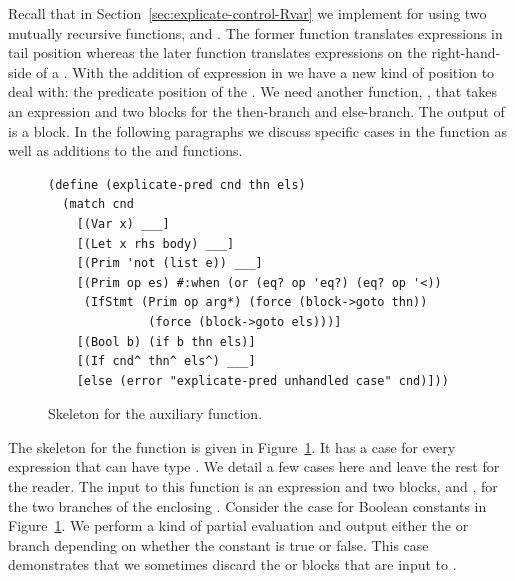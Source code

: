 \documentclass[11pt]{book}
\begin{document}


Recall that in Section~\ref{sec:explicate-control-Rvar} we implement
 for \LangVar{} using two mutually recursive
functions,  and .  The
former function translates expressions in tail position whereas the
later function translates expressions on the right-hand-side of a
. With the addition of  expression in \LangIf{} we
have a new kind of position to deal with: the predicate position of
the . We need another function, , that
takes an \LangIf{} expression and two blocks for the then-branch and
else-branch. The output of  is a block.
%
In the following paragraphs we discuss specific cases in the
 function as well as additions to the
 and  functions.

\begin{figure}[tbp]
\begin{lstlisting}
(define (explicate-pred cnd thn els)
  (match cnd
    [(Var x) ___]
    [(Let x rhs body) ___]
    [(Prim 'not (list e)) ___]
    [(Prim op es) #:when (or (eq? op 'eq?) (eq? op '<))
     (IfStmt (Prim op arg*) (force (block->goto thn))
              (force (block->goto els)))]
    [(Bool b) (if b thn els)]
    [(If cnd^ thn^ els^) ___]
    [else (error "explicate-pred unhandled case" cnd)]))
\end{lstlisting}
\caption{Skeleton for the  auxiliary function.}
\label{fig:explicate-pred}
\end{figure}

The skeleton for the  function is given in
Figure~\ref{fig:explicate-pred}. It has a case for every expression
that can have type .  We detail a few cases here and
leave the rest for the reader. The input to this function is an
expression and two blocks,  and , for the two
branches of the enclosing .
%
Consider the case for Boolean constants in
Figure~\ref{fig:explicate-pred}.  We perform a kind of partial
evaluation and output either the 
or  branch depending on whether the constant is true or
false. This case demonstrates that we sometimes discard the 
or  blocks that are input to .
\end{document}

